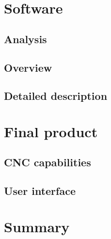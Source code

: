 \documentclass[
    bindingoffset=5mm,
    footnoteindent=3mm,
    hyphenation=true
]{template/wut-thesis}
\begin{document}
\section{Software}
\subsection{Analysis}
\subsection{Overview}
\subsection{Detailed description}

\section{Final product}
\subsection{CNC capabilities}
\subsection{User interface}

\section{Summary}

\cleardoublepage
\printbibliography
\clearpage

\acronymlist


\vspace{0.8cm}

\pagestyle{plain}

\listoffigurestoc
\vspace{1cm}
\listoftablestoc
\vspace{1cm}
\listofappendicestoc

\captionsetup[figure]{list=no}
\captionsetup[table]{list=no}

\end{document}
